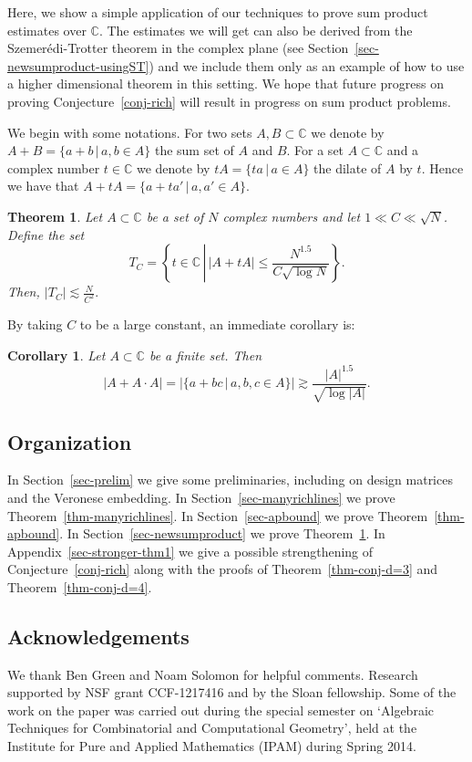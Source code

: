 \documentclass[11pt]{article}
\newtheorem{cor}[thm]{Corollary}
\newtheorem{THM}{Theorem}
\def\C{{\mathbb{C}}}
\begin{document}
Here, we show a simple application of our techniques to prove sum product estimates over $\C$. The estimates we will get can also be derived from the  Szemer\'edi-Trotter theorem in the complex plane (see Section~\ref{sec-newsumproduct-usingST}) and we include them only as an example of how to use a higher dimensional theorem in this setting. We hope that future progress on proving Conjecture~\ref{conj-rich} will result in progress on sum product problems.

We begin with some notations. For two sets $A,B \subset \C$ we denote by $A+B = \{a+b \,|\, a,b \in A\}$ the sum set of $A$ and $B$. For a set $A \subset \C$ and a complex number $t \in \C$ we denote by $tA = \{ ta \,|\, a \in A \}$ the dilate of $A$ by $t$. Hence we have that  $A+tA = \{ a + ta'\,|\, a,a' \in A\}$.

\begin{THM}\label{thm-newsumproduct}
Let $A \subset \C$ be a set of $N$ complex numbers and let $1\ll C \ll \sqrt{N}$. Define the set $$T_C = \left\{ t \in \C \,\left|\, |A + tA| \leq \frac{N^{1.5}}{C\sqrt{\log N}} \right. \right\}.$$ Then, $ |T_C| \lesssim \frac{N}{C^2}.$
\end{THM}

By taking $C$ to be a large constant, an immediate corollary is:
\begin{cor}
Let $A \subset \C$ be a finite set. Then $$ | A+ A\cdot A| = |\{ a + bc \,|\, a,b,c \in A\}| \gtrsim \frac{|A|^{1.5}}{\sqrt{\log |A|}}.$$
\end{cor}

\subsection{Organization}

In Section~\ref{sec-prelim} we give some preliminaries, including on design matrices and the Veronese embedding. In Section~\ref{sec-manyrichlines} we prove Theorem~\ref{thm-manyrichlines}. In Section~\ref{sec-apbound} we prove Theorem~\ref{thm-apbound}. In Section~\ref{sec-newsumproduct} we prove Theorem~\ref{thm-newsumproduct}. In Appendix~\ref{sec-stronger-thm1} we give a possible strengthening of Conjecture~\ref{conj-rich} along with the proofs of Theorem~\ref{thm-conj-d=3} and Theorem~\ref{thm-conj-d=4}.

\subsection{Acknowledgements}
We thank Ben Green and Noam Solomon for helpful comments.  Research supported by NSF grant CCF-1217416 and by the Sloan fellowship. Some of the work on the paper was carried out during the special semester on `Algebraic Techniques for Combinatorial and Computational Geometry', held at the Institute for Pure and Applied Mathematics (IPAM) during Spring 2014.
\end{document}
